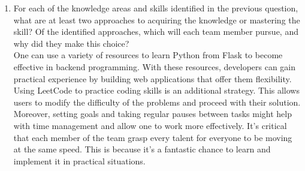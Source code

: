 \documentclass[12pt, titlepage]{article}
\begin{document}
\begin{enumerate}
  \item For each of the knowledge areas and skills identified in the previous question, what are at least two approaches to acquiring the knowledge or mastering the skill?  Of the identified approaches, which will each team member pursue, and why did they make this choice?\\
  One can use a variety of resources to learn Python from Flask to become effective in backend programming. With these resources, developers can gain practical experience by building web applications that offer them flexibility. Using LeetCode to practice coding skills is an additional strategy. This allows users to modify the difficulty of the problems and proceed with their solution. Moreover, setting goals and taking regular pauses between tasks might help with time management and allow one to work more effectively. It's critical that each member of the team grasp every talent for everyone to be moving at the same speed. This is because it's a fantastic chance to learn and implement it in practical situations.
\end{enumerate}
\end{document}
